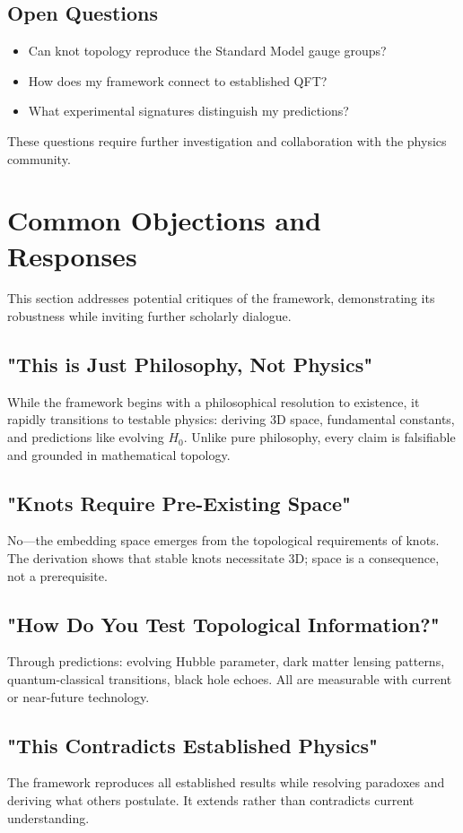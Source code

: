 \documentclass{article}
\begin{document}
\subsection{Open Questions}
\begin{itemize}
\item Can knot topology reproduce the Standard Model gauge groups?
\item How does my framework connect to established QFT?
\item What experimental signatures distinguish my predictions?
\end{itemize}
These questions require further investigation and collaboration with the physics community.

\section{Common Objections and Responses}
This section addresses potential critiques of the framework, demonstrating its robustness while inviting further scholarly dialogue.

\subsection{"This is Just Philosophy, Not Physics"}
While the framework begins with a philosophical resolution to existence, it rapidly transitions to testable physics: deriving 3D space, fundamental constants, and predictions like evolving $H_0$. Unlike pure philosophy, every claim is falsifiable and grounded in mathematical topology.

\subsection{"Knots Require Pre-Existing Space"}
No—the embedding space emerges from the topological requirements of knots. The derivation shows that stable knots necessitate 3D; space is a consequence, not a prerequisite.

\subsection{"How Do You Test Topological Information?"}
Through predictions: evolving Hubble parameter, dark matter lensing patterns, quantum-classical transitions, black hole echoes. All are measurable with current or near-future technology.

\subsection{"This Contradicts Established Physics"}
The framework reproduces all established results while resolving paradoxes and deriving what others postulate. It extends rather than contradicts current understanding.
\end{document}
